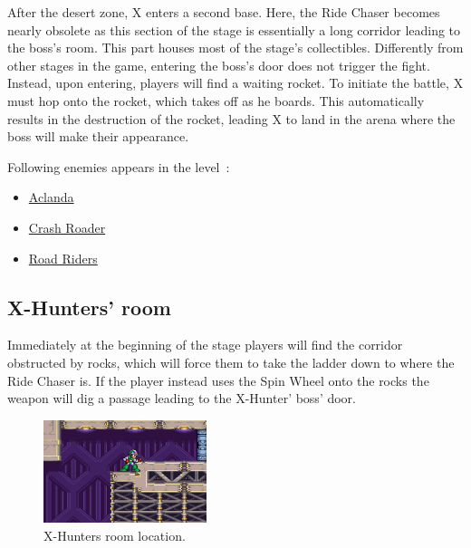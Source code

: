 After the desert zone, X enters a second base. Here, the Ride Chaser becomes nearly obsolete as this section of the stage is essentially a long corridor leading to the boss's room. This part houses most of the stage's collectibles. Differently from other stages in the game, entering the boss's door does not trigger the fight. Instead, upon entering, players will find a waiting rocket. To initiate the battle, X must hop onto the rocket, which takes off as he boards. This automatically results in the destruction of the rocket, leading X to land in the arena where the boss will make their appearance.

Following enemies appears in the level~\cite{wiki:Desert_base}:
\begin{itemize}
	\item \hyperlink{enem:Aclanda}{Aclanda}
	\item \hyperlink{enem:Crash_Roader}{Crash Roader}
	\item \hyperlink{enem:Road_Riders}{Road Riders}
\end{itemize}

\subsection{X-Hunters' room}
Immediately at the beginning of the stage players will find the corridor obstructed by rocks, which will force them to take the ladder down to where the Ride Chaser is. If the player instead uses the Spin Wheel onto the rocks the weapon will dig a passage leading to the X-Hunter' boss' door.

\begin{figure}[htp]
	\centering
	\includegraphics[height=3cm]{figures/X2/Overdrive_ostrich/Ostrich_Hunter_room.png}
	\caption{X-Hunters room location.}
\end{figure}

